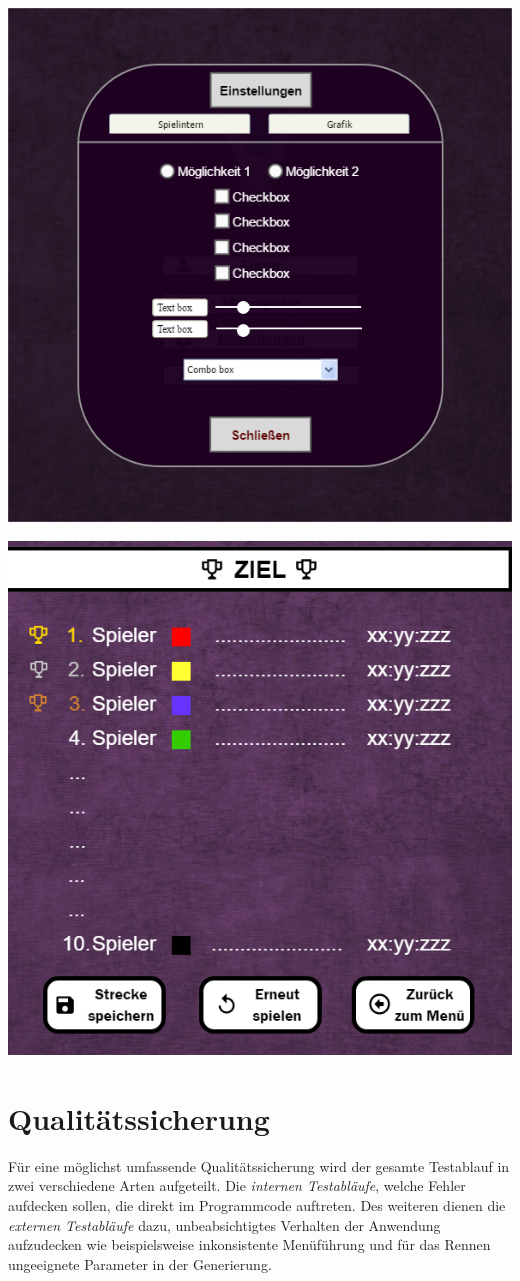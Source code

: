 \documentclass[parskip=full]{scrartcl}
\begin{document}
\begin{center}
  	 	\includegraphics[width=.6\linewidth]{./Bilder/einstellungen.png}
  	 	\label{fig:Einstellungen}

    	\includegraphics[width=.8\linewidth]{./Bilder/endscreen.png}
  	 	\label{fig:Endbildschirm}
	\end{center}
	
	\newpage
	
	\section{Qualitätssicherung}
	
	Für eine möglichst umfassende Qualitätssicherung wird der gesamte Testablauf in zwei verschiedene Arten aufgeteilt.
	Die \textit{internen Testabläufe}, welche Fehler aufdecken sollen, die direkt im Programmcode auftreten.
	Des weiteren dienen die \textit{externen Testabläufe} dazu, unbeabsichtigtes Verhalten der Anwendung aufzudecken wie beispielsweise inkonsistente Menüführung
	und für das Rennen ungeeignete Parameter in der Generierung.
	
\end{document}

